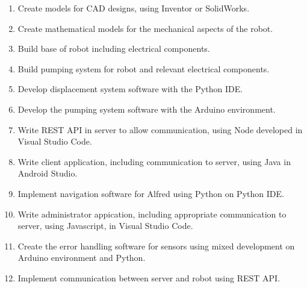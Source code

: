 \documentclass [10pt]{article}
\begin{document}
	\begin{enumerate}
		\item Create models for CAD designs, using Inventor or SolidWorks.
		\item Create mathematical models for the mechanical aspects of the robot.
		\item Build base of robot including electrical components.
		\item Build pumping system for robot and relevant electrical components.
		\item Develop displacement system software with the Python IDE.
		\item Develop the pumping system software with the Arduino environment.
		\item Write REST API in server to allow communication, using Node developed in Visual Studio Code.
		\item Write client application, including communication to server, using Java in Android Studio.
		\item Implement navigation software for Alfred using Python on Python IDE.
		\item Write administrator appication, including appropriate communication to server, using Javascript, in Visual Studio Code.
		\item Create the error handling software for sensors using mixed development on Arduino environment and Python.
		\item Implement communication between server and robot using REST API.
	\end{enumerate}


\end{document}
